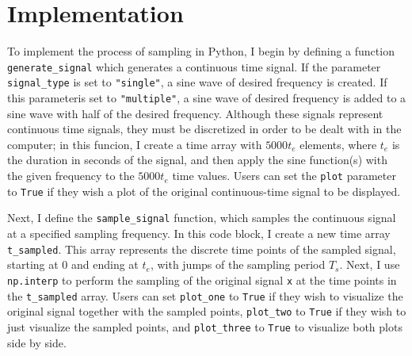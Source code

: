 \documentclass{article}
\begin{document}
\section{Implementation}


To implement the process of sampling in Python, I begin by defining a function \verb|generate_signal| which generates a continuous time signal.
If the parameter \verb|signal_type| is set to \verb|"single"|, a sine wave of desired frequency is created.
If this parameteris set to \verb|"multiple"|, a sine wave of desired frequency is added to a sine wave with half of the desired frequency. 
Although these signals represent continuous time signals, they must be discretized in order to be dealt with in the computer;
in this funcion, I create a time array with $5000t_e$ elements, where $t_e$ is the duration in seconds of the signal, 
and then apply the sine function(s) with the given frequency to the $5000 t_e$ time values. 
Users can set the \verb|plot| parameter to \verb|True| if they wish a plot of the original continuous-time signal to be displayed.

Next, I define the \verb|sample_signal| function, which samples the continuous signal at a specified sampling frequency.
In this code block, I create a new time array \verb|t_sampled|. 
This array represents the discrete time points of the sampled signal, starting at 0 and ending at $t_e$, with jumps of the sampling period $T_s$.
Next, I use \verb|np.interp| to perform the sampling of the original signal \verb|x| at the time points in the \verb|t_sampled| array.
Users can set \verb|plot_one| to \verb|True| if they wish to visualize the original signal together with the sampled points, \verb|plot_two| to \verb|True| if they wish to just visualize the sampled points, and \verb|plot_three| to \verb|True| to visualize both plots side by side.
\end{document}
